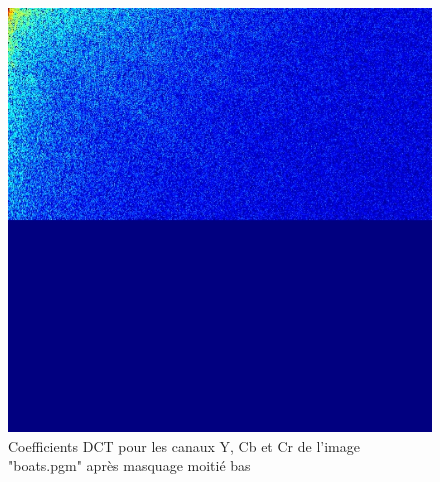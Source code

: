 \documentclass[12pt]{report}
\begin{document}
\begin{figure}[H]
\begin{center}
\includegraphics[scale=0.25]{../ImageRes/dct_masked2_2.jpg} 
\caption{Coefficients DCT pour les canaux Y, Cb et Cr de l'image "boats.pgm" après masquage moitié bas}
\end{center}
\end{figure}
\end{document}
